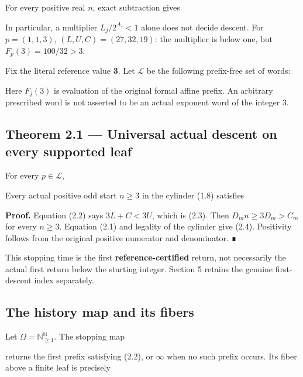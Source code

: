 For every positive real \(n\), exact subtraction gives


In particular, a multiplier \(L_j/2^{A_j}<1\) alone does not decide
descent. For \(p=(1,1,3)\), \((L,U,C)=(27,32,19)\): the multiplier is
below one, but \(F_p(3)=100/32>3\).

Fix the literal reference value \textbf{3}. Let \(\mathcal L\) be the
following prefix-free set of words:


Here \(F_j(3)\) is evaluation of the original formal affine prefix. An
arbitrary prescribed word is not asserted to be an actual exponent word
of the integer 3.

\subsection{Theorem 2.1 --- Universal actual descent on every supported
leaf}

For every \(p\in\mathcal L\),


Every actual positive odd start \(n\ge3\) in the cylinder (1.8)
satisfies


\textbf{Proof.} Equation (2.2) says \(3L+C<3U\), which is (2.3). Then
\(D_mn\ge3D_m>C_m\) for every \(n\ge3\). Equation (2.1) and legality of
the cylinder give (2.4). Positivity follows from the original positive
numerator and denominator. ∎

This stopping time is the first \textbf{reference-certified} return, not
necessarily the actual first return below the starting integer. Section
5 retains the genuine first-descent index separately.

\subsection{The history map and its fibers}

Let \(\Omega=\mathbb N_{\ge1}^{\mathbb N}\). The stopping map


returns the first prefix satisfying (2.2), or \(\infty\) when no such
prefix occurs. Its fiber above a finite leaf is precisely

